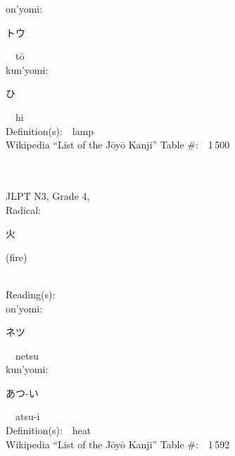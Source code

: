 \begin{multicols}{2}
{\hspace*{1em}}on'yomi:\ \ \\
{\hspace*{2em}}{\begin{CJK}{UTF8}{min} トウ \end{CJK}}\ \ t\=o\ \ \\
{\hspace*{1em}}kun'yomi:\ \ \\
{\hspace*{2em}}{\begin{CJK}{UTF8}{min} ひ \end{CJK}}\ \ hi\ \ \\
Definition(s):\ \ lamp \\
Wikipedia ``List of the J\=oy\=o Kanji'' Table \#:\ \ 1\,500 \\
\ \ \\
{\fontsize{34pt}{40pt}  }\ \ \\  %
{JLPT N3, Grade 4, \\Radical:\ \ {\begin{CJK}{UTF8}{min} 火 \end{CJK}} (fire) } \\
Reading(s):\ \ \\
{\hspace*{1em}}on'yomi:\ \ \\
{\hspace*{2em}}{\begin{CJK}{UTF8}{min} ネツ \end{CJK}}\ \ netsu\ \ \\
{\hspace*{1em}}kun'yomi:\ \ \\
{\hspace*{2em}}{\begin{CJK}{UTF8}{min} あつ-い \end{CJK}}\ \ atsu-i\ \ \\
Definition(s):\ \ heat \\
Wikipedia ``List of the J\=oy\=o Kanji'' Table \#:\ \ 1\,592 \\
\ \ \\
{\fontsize{34pt}{40pt}  }\ \ \\  %

\end{multicols}

